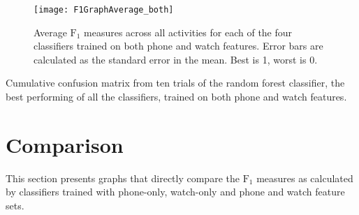     \begin{figure}
      \centering
      \texttt{[image: F1GraphAverage\_both]}
      \caption{Average $\mathrm{F}_1$ measures across all activities for each of the four classifiers trained on both phone and watch features. Error bars are calculated as the standard error in the mean. Best is 1, worst is 0.}
      \label{fig:F1GraphAverage_both}
    \end{figure}
    
    \begin{table}
      \tabcolsep=0.11cm
      \centering
        
      \caption{Cumulative confusion matrix from ten trials of the random forest classifier, the best performing of all the classifiers, trained on both phone and watch features.}
      \label{tab:ConfusionMatrix_both_RandomForestClassifier}
    \end{table}
  
  \section{Comparison}
    This section presents graphs that directly compare the $\mathrm{F}_1$ measures as calculated by classifiers trained with phone-only, watch-only and phone and watch feature sets.
    
